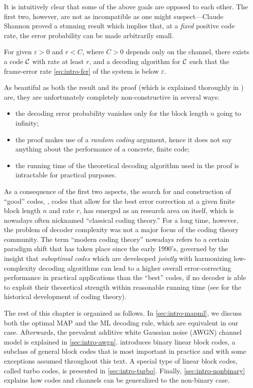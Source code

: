 It is intuitively clear that some of the above goals are opposed to each other. The first two, however, are not as incompatible as one might suspect—Claude Shannon proved a stunning result \cite{Shannon48} which implies that, at a \emph{fixed} positive code rate, the error probability can be made arbitrarily small.
\begin{theorem}
  \label{thm:intro-noisychannel}
  For given $ε>0$ and $r < C$, where $C > 0$ depends only on the channel, there exists a code $\mathcal{C}$ with rate at least $r$, and a decoding algorithm for $\mathcal{C}$ such that the frame-error rate \cref{eq:intro-fer} of the system is below $ε$.
\end{theorem}
As beautiful as both the result and its proof (which is explained thoroughly in \cite{MacKay03InformationTheory}) are, they are unfortunately completely non-constructive in several ways:
\begin{itemize}
  \item the decoding error probability vanishes only for the block length $n$ going to infinity;
  \item the proof makes use of a \emph{random coding} argument, hence it does not say anything about the performance of a concrete, finite code;
  \item the running time of the theoretical decoding algorithm used in the proof is intractable for practical purposes.
\end{itemize}

As a consequence of the first two aspects, the search for and construction of \enquote{good} codes, \ie, codes that allow for the best error correction at a given finite block length $n$ and rate $r$, has emerged as an research area on itself, which is nowadays often nicknamed \enquote{classical coding theory.} For a long time, however, the problem of decoder complexity was not a major focus of the coding theory community. The term \enquote{modern coding theory} nowadays refers to a certain paradigm shift that has taken place since the early 1990's, governed by the insight that \emph{suboptimal codes} which are develeoped \emph{jointly} with harmonizing low-complexity decoding algorithms can lead to a higher overall error-correcting performance in practical applications than the \enquote{best} codes, if no decoder is able to exploit their theoretical strength within reasonable running time (see \cite{CostelloForney07RoadToCapacity} for the historical development of coding theory).

The rest of this chapter is organized as follows. In \cref{sec:intro-mapml}, we discuss both the optimal MAP and the ML decoding rule, which are equivalent in our case. Afterwards, the prevalent additive white Gaussian noise (AWGN) channel model is explained in \cref{sec:intro-awgn}.  introduces binary linear block codes, a subclass of general block codes that is most important in practice and with some exceptions assumed throughout this text. A special type of linear block codes, called turbo codes, is presented in \cref{sec:intro-turbo}. Finally, \cref{sec:intro-nonbinary} explains how codes and channels can be generalized to the non-binary case.

